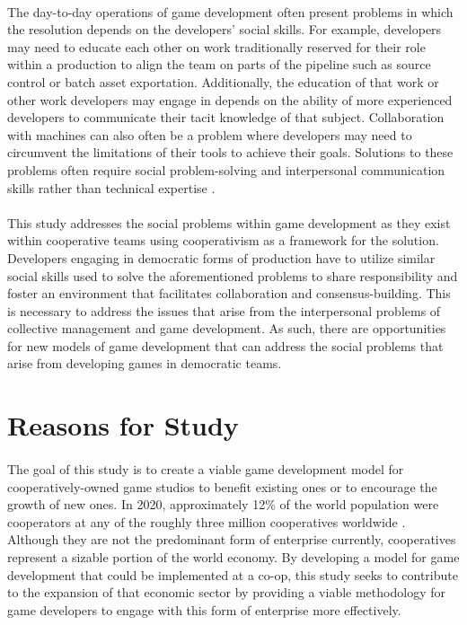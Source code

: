 
\paragraph{} The day-to-day operations of game development often present problems in which the resolution depends on the developers' social skills. For example, developers may need to educate each other on work traditionally reserved for their role within a production to align the team on parts of the pipeline such as source control or batch asset exportation. Additionally, the education of that work or other work developers may engage in depends on the ability of more experienced developers to communicate their tacit knowledge of that subject. Collaboration with machines can also often be a problem where developers may need to circumvent the limitations of their tools to achieve their goals. Solutions to these problems often require social problem-solving and interpersonal communication skills rather than technical expertise \autocite{whitson_what_2020}.

\paragraph{} This study addresses the social problems within game development as they exist within cooperative teams using cooperativism as a framework for the solution. Developers engaging in democratic forms of production have to utilize similar social skills used to solve the aforementioned problems to share responsibility and foster an environment that facilitates collaboration and consensus-building. This is necessary to address the issues that arise from the interpersonal problems of collective management and game development. As such, there are opportunities for new models of game development that can address the social problems that arise from developing games in democratic teams.

\section{Reasons for Study}

\paragraph{} The goal of this study is to create a viable game development model for cooperatively-owned game studios to benefit existing ones or to encourage the growth of new ones. In 2020, approximately 12\% of the world population were cooperators at any of the roughly three million cooperatives worldwide \autocite{world_cooperative_monitor_exploring_2020}. Although they are not the predominant form of enterprise currently, cooperatives represent a sizable portion of the world economy. By developing a model for game development that could be implemented at a co-op, this study seeks to contribute to the expansion of that economic sector by providing a viable methodology for game developers to engage with this form of enterprise more effectively.

